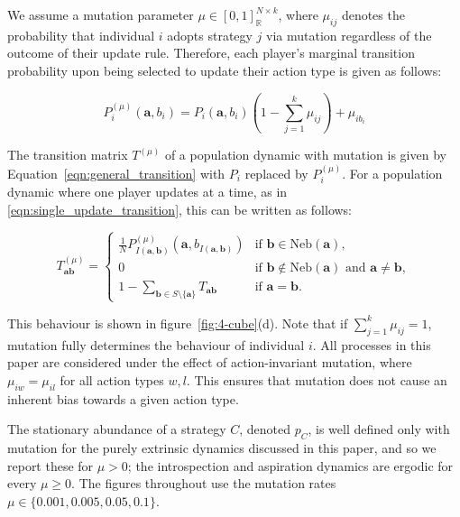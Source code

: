 \documentclass{article}
\begin{document}
We assume a mutation parameter \(\mu \in [0, 1]_{\mathbb{R}}^{N \times k}\),
where \(\mu_{ij}\) denotes the probability that individual \(i\) adopts strategy
\(j\) via mutation regardless of the outcome of their update rule. Therefore,
each player's marginal transition probability upon being selected to update
their action type is given as follows:

\begin{equation}
    P^{(\mu)}_i(\mathbf{a}, b_i) = P_i(\mathbf{a}, b_i)\left(1 - \sum_{j=1}^k \mu_{ij}\right)
     + \mu_{ib_i}
    \label{eqn:mutation_update_rule}
\end{equation}

The transition matrix \(T^{(\mu)}\) of a population dynamic with mutation is
given by Equation~\eqref{eqn:general_transition} with \(P_i\) replaced by
\(P^{(\mu)}_i\). For a population dynamic where one player updates at a time, as
in \eqref{eqn:single_update_transition}, this can be written as follows:

\begin{equation}
    T^{(\mu)}_{\mathbf{ab}} =
    \begin{cases}
        \frac{1}{N} P^{(\mu)}_{I(\mathbf{a,b})}(\mathbf{a}, b_{I(\mathbf{a,b})})
        & \text{if } \mathbf{b} \in \text{Neb}(\mathbf{a}), \\
        0
        & \text{if } \mathbf{b} \notin \text{Neb}(\mathbf{a}) \text{ and } \mathbf{a} \neq \mathbf{b}, \\
        1 - \sum_{\mathbf{b} \in S \setminus \{\mathbf{a}\}} T_{\mathbf{ab}}
        & \text{if } \mathbf{a} = \mathbf{b}.
    \end{cases}
    \label{eqn:mutation_transition}
\end{equation}

This behaviour is shown in figure~\ref{fig:4-cube}(d). Note that if
\(\sum_{j=1}^k \mu_{ij} = 1\), mutation fully determines the behaviour of
individual \(i\). All processes in this paper are considered
under the effect of action-invariant mutation, where \(\mu_{iw} = \mu_{il}\) for
all action types \(w,l\). This ensures that mutation does not cause an inherent
bias towards a given action type.

The stationary abundance of a strategy \(C\), denoted \(p_C\), is well defined
only with mutation for the purely extrinsic dynamics discussed in this paper,
and so we report these for \(\mu > 0\); the introspection and aspiration
dynamics are ergodic for every \(\mu \geq 0\). The figures throughout use the
mutation rates \(\mu \in \{0.001, 0.005, 0.05, 0.1\}\).
\end{document}
